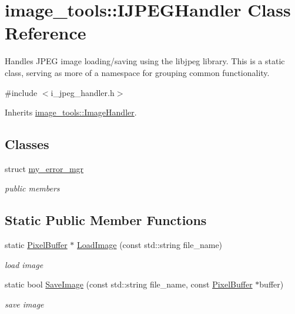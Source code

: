 \hypertarget{classimage__tools_1_1IJPEGHandler}{}\section{image\+\_\+tools\+:\+:I\+J\+P\+E\+G\+Handler Class Reference}
\label{classimage__tools_1_1IJPEGHandler}


Handles J\+P\+EG image loading/saving using the libjpeg library. This is a static class, serving as more of a namespace for grouping common functionality.  




{\ttfamily \#include $<$i\+\_\+jpeg\+\_\+handler.\+h$>$}



Inherits \hyperlink{classimage__tools_1_1ImageHandler}{image\+\_\+tools\+::\+Image\+Handler}.

\subsection*{Classes}
\begin{DoxyCompactItemize}
\item 
struct \hyperlink{structimage__tools_1_1IJPEGHandler_1_1my__error__mgr}{my\+\_\+error\+\_\+mgr}
\begin{DoxyCompactList}\small\item\em public members \end{DoxyCompactList}\end{DoxyCompactItemize}
\subsection*{Static Public Member Functions}
\begin{DoxyCompactItemize}
\item 
static \hyperlink{classimage__tools_1_1PixelBuffer}{Pixel\+Buffer} $\ast$ \hyperlink{classimage__tools_1_1IJPEGHandler_a8230699e4d2722b59026ce5cd61de947}{Load\+Image} (const std\+::string file\+\_\+name)\hypertarget{classimage__tools_1_1IJPEGHandler_a8230699e4d2722b59026ce5cd61de947}{}\label{classimage__tools_1_1IJPEGHandler_a8230699e4d2722b59026ce5cd61de947}

\begin{DoxyCompactList}\small\item\em load image \end{DoxyCompactList}\item 
static bool \hyperlink{classimage__tools_1_1IJPEGHandler_a9f4e3b2a9a1551cfeac6e43a59ead011}{Save\+Image} (const std\+::string file\+\_\+name, const \hyperlink{classimage__tools_1_1PixelBuffer}{Pixel\+Buffer} $\ast$buffer)\hypertarget{classimage__tools_1_1IJPEGHandler_a9f4e3b2a9a1551cfeac6e43a59ead011}{}\label{classimage__tools_1_1IJPEGHandler_a9f4e3b2a9a1551cfeac6e43a59ead011}

\begin{DoxyCompactList}\small\item\em save image \end{DoxyCompactList}\end{DoxyCompactItemize}
